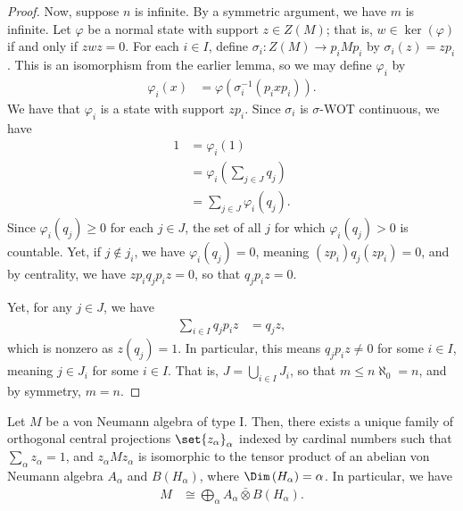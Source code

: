 \documentclass[10pt]{mypackage}
\begin{document}
\begin{proof}
  Now, suppose $n$ is infinite. By a symmetric argument, we have $m$ is infinite. Let $\varphi$ be a normal state with support $z\in Z(M)$; that is, $w\in \ker\left( \varphi \right)$ if and only if $zwz = 0$. For each $i\in I$, define $\sigma_i\colon Z\left( M \right)\rightarrow p_iMp_i$ by $\sigma_i(z) = zp_i$. This is an isomorphism from the earlier lemma, so we may define $\varphi_i$ by
  \begin{align*}
    \varphi_i\left( x \right) &= \varphi\left( \sigma_i^{-1}\left( p_ixp_i \right) \right).
  \end{align*}
  We have that $\varphi_i$ is a state with support $zp_i$. Since $\sigma_i$ is $\sigma$-WOT continuous, we have
  \begin{align*}
    1 &= \varphi_i\left( 1 \right)\\
      &= \varphi_i\left( \sum_{j\in J}q_j \right)\\
      &= \sum_{j\in J}\varphi_i\left( q_j \right).
  \end{align*}
  Since $\varphi_i\left( q_j \right) \geq 0$ for each $j\in J$, the set of all $j$ for which $\varphi_i\left( q_j \right) > 0$ is countable. Yet, if $j\notin j_i$, we have $\varphi_i\left( q_j \right) = 0$, meaning $\left( zp_i \right)q_j\left( zp_i \right) = 0$, and by centrality, we have $zp_iq_jp_iz = 0$, so that $q_jp_iz = 0$.

  Yet, for any $j\in J$, we have
  \begin{align*}
    \sum_{i\in I}q_jp_iz &= q_jz,
  \end{align*}
  which is nonzero as $z\left( q_j \right) = 1$. In particular, this means $q_jp_iz \neq 0$ for some $i\in I$, meaning $j\in J_i$ for some $i\in I$. That is, $J = \bigcup_{i\in I}J_i$, so that $m\leq n\aleph_0 = n$, and by symmetry, $m = n$.
\end{proof}
\begin{theorem}
  Let $M$ be a von Neumann algebra of type I. Then, there exists a unique family of orthogonal central projections $\set{z_{\alpha}}_{\alpha}$ indexed by cardinal numbers such that $\sum_{\alpha} z_{\alpha} = 1$, and $z_{\alpha}Mz_{\alpha}$ is isomorphic to the tensor product of an abelian von Neumann algebra $A_{\alpha}$ and $B\left( H_{\alpha} \right)$, where $\Dim\left( H_{\alpha} \right) = \alpha$. In particular, we have
  \begin{align*}
    M &\cong \bigoplus_{\alpha} A_{\alpha}\bar\otimes B\left( H_{\alpha} \right).
  \end{align*}
\end{theorem}
\end{document}

